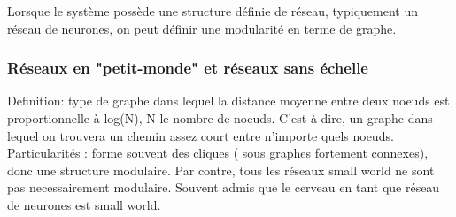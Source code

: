 Lorsque le système possède une structure définie de réseau, typiquement un réseau de neurones, on peut définir une modularité en terme de graphe.

\subsubsection{Réseaux en "petit-monde" et réseaux sans échelle}
Definition: type de graphe dans lequel la distance moyenne entre deux noeuds est proportionnelle à log(N), N le nombre de noeuds. C'est à dire, un graphe dans lequel on trouvera un chemin assez court entre n'importe quels noeuds. 
Particularités : forme souvent des cliques ( sous graphes fortement connexes), donc une structure modulaire. Par contre, tous les réseaux small world ne sont pas necessairement modulaire. 
Souvent admis que le cerveau en tant que réseau de neurones est small world. 

